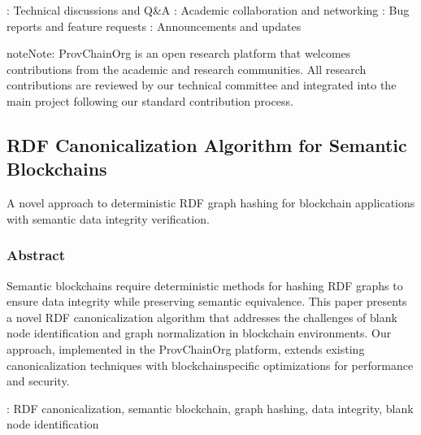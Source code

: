 \documentclass[letterpaper,10pt,english]{sphinxmanual}
\begin{document}
\sphinxAtStartPar
{}
\sphinxhyphen{} : Technical discussions and Q\&A
\sphinxhyphen{} : Academic collaboration and networking
\sphinxhyphen{} : Bug reports and feature requests
\sphinxhyphen{} : Announcements and updates

\begin{sphinxadmonition}{note}{Note:}
\sphinxAtStartPar
ProvChainOrg is an open research platform that welcomes contributions from the academic and research communities. All research contributions are reviewed by our technical committee and integrated into the main project following our standard contribution process.
\end{sphinxadmonition}



\sphinxstepscope


\subsection{RDF Canonicalization Algorithm for Semantic Blockchains}
\label{\detokenize{research/rdf-canonicalization-algorithm:rdf-canonicalization-algorithm-for-semantic-blockchains}}\label{\detokenize{research/rdf-canonicalization-algorithm::doc}}
\sphinxAtStartPar
A novel approach to deterministic RDF graph hashing for blockchain applications with semantic data integrity verification.




\subsubsection{Abstract}
\label{\detokenize{research/rdf-canonicalization-algorithm:abstract}}
\sphinxAtStartPar
Semantic blockchains require deterministic methods for hashing RDF graphs to ensure data integrity while preserving semantic equivalence. This paper presents a novel RDF canonicalization algorithm that addresses the challenges of blank node identification and graph normalization in blockchain environments. Our approach, implemented in the ProvChainOrg platform, extends existing canonicalization techniques with blockchain\sphinxhyphen{}specific optimizations for performance and security.

\sphinxAtStartPar
{}: RDF canonicalization, semantic blockchain, graph hashing, data integrity, blank node identification
\end{document}
